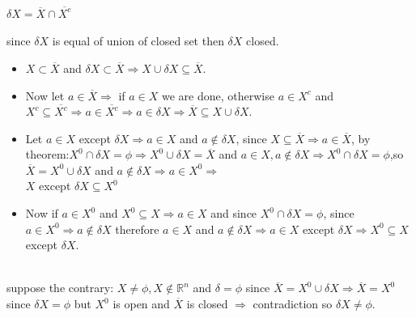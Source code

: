 \documentclass{book}
\begin{document}
\begin{tcolorbox}[enhanced,attach boxed title to top center={yshift=-3mm,yshifttext=-1mm},
colback=blue!5!white,colframe=blue!75!black,colbacktitle=red!80!black,
title={Exercise 39.12:},fonttitle=\bfseries,
boxed title style={size=small,colframe=red!50!black} ]
{\color{red}{Proof:}}  
$\delta X=\overline{X}\cap\overline{X^c}$\\

{\color{red}{(a)-$\delta X $ is closed}}\\
since $\delta X$ is equal of union of closed set then $\delta X$ closed.\\

{}
\begin{itemize}
\item $X\subset\overline{X}$ and $\delta X\subset \overline{X}\Rightarrow X\cup \delta X\subseteq 
\overline{X}$.
\item Now let $a\in \overline{X}\Rightarrow $ if $a\in X$ we are done, otherwise $a\in X^c$ and 
$X^c\subseteq \overline{X^c}\Rightarrow a\in
\overline{X^c}\Rightarrow a\in \delta X\Rightarrow \overline{X}\subseteq X\cup\delta X$.
\end{itemize}
{\color{red}{(c)-$X$ except $\delta X=X^0$}}
\begin{itemize}
\item Let $a\in X$ except $\delta X\Rightarrow a\in X$ and $a\notin \delta X$, since 
$X\subseteq\overline{X}\Rightarrow a\in\overline{X}$, by theorem:$\boxed{X^0\cap\delta X=\phi\Rightarrow 
X^0\cup\delta X=\overline{X}}$ and $a\in X,a\notin\delta X\Rightarrow X^0\cap\delta X=\phi$,so 
$\overline{X}=X^0\cup\delta X$ and $a\notin\delta X\Rightarrow a\in X^0\Rightarrow$\\
$X$ except $\delta X\subseteq X^0$ 
\item Now if $a\in X^0$ and $X^0\subseteq X\Rightarrow a\in X$ and since 
$X^0\cap \delta X=\phi$, since $a\in X^0\Rightarrow a\notin \delta
X$ therefore $a\in X$ and $a\notin\delta X\Rightarrow a\in X$ except $\delta X\Rightarrow X^0\subseteq X$ 
except $\delta X$. 
\end{itemize}

{}\\
suppose the contrary: $X\neq\phi, X\notin \mathbb{R}^n$ and $\delta=\phi$ since $\overline{X}=X^0\cup\delta 
X\Rightarrow
\overline{X}=X^0$ since $\delta X=\phi$ but $X^0$ is open and $\overline{X}$ is closed $\Rightarrow$ 
contradiction so $\delta X\neq\phi$.

\end{tcolorbox}
\end{document}
